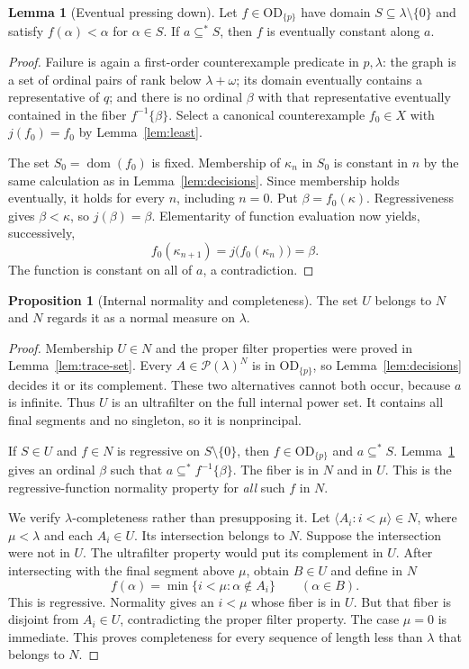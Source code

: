 \documentclass[11pt,letterpaper]{article}
\theoremstyle{definition}
\newtheorem{proposition}[definition]{Proposition}
\newtheorem{lemma}[definition]{Lemma}
\numberwithin{equation}{section}
\newcommand{\OD}{\mathrm{OD}}
\newcommand{\Pow}{\mathcal P}
\newcommand{\dom}{\operatorname{dom}}
\newcommand{\ODp}{\OD_{\{p\}}}
\newcommand{\seq}[1]{\langle #1\rangle}
\begin{document}
\begin{lemma}[Eventual pressing down]\label{lem:press}
Let $f\in\ODp$ have domain $S\subseteq\lambda\setminus\{0\}$ and
satisfy $f(\alpha)<\alpha$ for $\alpha\in S$. If $a\subseteq^*S$, then
$f$ is eventually constant along $a$.
\end{lemma}

\begin{proof}
Failure is again a first-order counterexample predicate in $p,\lambda$:
the graph is a set of ordinal pairs of rank below $\lambda+\omega$;
its domain eventually contains a representative of $q$; and there is
no ordinal $\beta$ with that representative eventually contained in the
fiber $f^{-1}\{\beta\}$. Select a canonical counterexample $f_0\in X$
with $j(f_0)=f_0$ by Lemma~\ref{lem:least}.

The set $S_0=\dom(f_0)$ is fixed. Membership of $\kappa_n$ in $S_0$ is
constant in $n$ by the same calculation as in
Lemma~\ref{lem:decisions}. Since membership holds eventually, it holds
for every $n$, including $n=0$. Put $\beta=f_0(\kappa)$. Regressiveness
gives $\beta<\kappa$, so $j(\beta)=\beta$. Elementarity of function
evaluation now yields, successively,
\[
 f_0(\kappa_{n+1})=j\bigl(f_0(\kappa_n)\bigr)=\beta.
\]
The function is constant on all of $a$, a contradiction.
\end{proof}

\begin{proposition}[Internal normality and completeness]\label{prop:normal}
The set $U$ belongs to $N$ and $N$ regards it as a normal measure on
$\lambda$.
\end{proposition}

\begin{proof}
Membership $U\in N$ and the proper filter properties were proved in
Lemma~\ref{lem:trace-set}. Every $A\in\Pow(\lambda)^N$ is in $\ODp$,
so Lemma~\ref{lem:decisions} decides it or its complement. These two
alternatives cannot both occur, because $a$ is infinite. Thus $U$ is an
ultrafilter on the full internal power set. It contains all final
segments and no singleton, so it is nonprincipal.

If $S\in U$ and $f\in N$ is regressive on $S\setminus\{0\}$, then
$f\in\ODp$ and $a\subseteq^* S$. Lemma~\ref{lem:press} gives an
ordinal $\beta$ such that $a\subseteq^* f^{-1}\{\beta\}$. The fiber is
in $N$ and in $U$. This is the regressive-function normality property
for \emph{all} such $f$ in $N$.

We verify $\lambda$-completeness rather than presupposing it. Let
$\seq{A_i:i<\mu}\in N$, where $\mu<\lambda$ and each $A_i\in U$.
Its intersection belongs to $N$. Suppose the intersection were not in
$U$. The ultrafilter property would put its complement in $U$. After
intersecting with the final segment above $\mu$, obtain $B\in U$ and
define in $N$
\[
 f(\alpha)=\min\{i<\mu:\alpha\notin A_i\}\qquad(\alpha\in B).
\]
This is regressive. Normality gives an $i<\mu$ whose fiber is in $U$.
But that fiber is disjoint from $A_i\in U$, contradicting the proper
filter property. The case $\mu=0$ is immediate. This proves
completeness for every sequence of length less than $\lambda$ that
belongs to $N$.
\end{proof}
\end{document}
